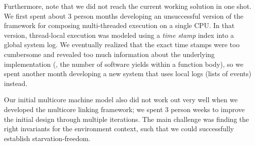 Furthermore, note that we did not reach the current working solution
in one shot. We first spent about 3 person months developing an
unsuccessful version of the framework for composing multi-threaded
execution on a single CPU.  In that version, thread-local execution
was modeled using a \emph{time stamp} index into a global system
log. We eventually realized that the exact time stamps were too
cumbersome and revealed too much information about the underlying
implementation (\eg, the number of software yields within a function
body), so we spent another month developing a new system that uses
local logs (lists of events) instead.  Our initial
multicore machine model also did not work out very well when we
developed the multicore linking framework; we spent 3 person weeks to
improve the initial design through multiple iterations.  The main
challenge was finding the right invariants for the environment
context, such that we could successfully establish starvation-freedom.



